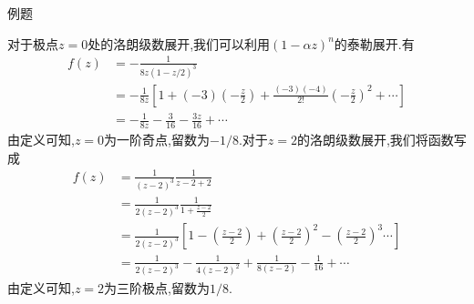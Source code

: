 \documentclass[fontset=windows, chinese, 10pt]{beamer}
\begin{document}
\begin{frame}{例题}
  \small
\begin{solution}
对于极点$z=0$处的洛朗级数展开,我们可以利用$(1-\alpha z)^n$的泰勒展开.有
\[
    \begin{aligned}
    f(z) &= -\frac{1}{8z(1-z/2)^3}
    \\
     &= -\frac{1}{8z}\left[ 1 + (-3) (-\frac{z}{2}) + \frac{(-3)(-4)}{2!} \left( -\frac{z}{2}\right)^2 + \cdots \right] 
    \\
     &= -\frac{1}{8z} - \frac{3}{16} - \frac{3z}{16} + \cdots   
    \end{aligned}
\]
由定义可知,$z=0$为一阶奇点,留数为$-1/8$.对于$z=2$的洛朗级数展开,我们将函数写成
\[
    \begin{aligned}
        f(z) &= \frac{1}{(z-2)^3} \frac{1}{z-2 + 2}
        \\
        &= \frac{1}{2(z-2)^3} \frac{1}{1+\frac{z-2}{2}}
        \\
        &= \frac{1}{2(z-2)^3} \left[ 1 - \left(\frac{z-2}{2} \right) + \left(\frac{z-2}{2}\right)^2 - \left(\frac{z-2}{2}\right)^3 \cdots \right] 
        \\
        &= \frac{1}{2(z-2)^3} - \frac{1}{4(z-2)^2} + \frac{1}{8(z-2)} - \frac{1}{16} + \cdots
    \end{aligned}
\]
由定义可知,$z=2$为三阶极点,留数为$1/8$.
\end{solution}
\end{frame}
\end{document}
